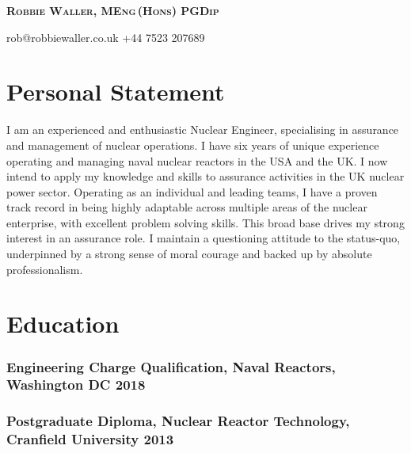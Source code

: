 \documentclass[a4paper, oneside, final, 11pt]{scrartcl} %
\begin{document}


{\fontsize{21}{21}\bfseries\scshape{Robbie Waller, MEng\,(Hons) PGDip}} %

\smallskip

  \faEnvelopeO \space rob@robbiewaller.co.uk \hfill  \faMobile \space +44 7523 207689


\section{Personal Statement}

I am an experienced and enthusiastic Nuclear Engineer, specialising in assurance and management of nuclear operations. I have six years of unique experience operating and managing naval nuclear reactors in the USA and the UK. I now intend to apply my knowledge and skills to assurance activities in the UK nuclear power sector. Operating as an individual and leading teams, I have a proven track record in being highly adaptable across multiple areas of the nuclear enterprise, with excellent problem solving skills. This broad base drives my strong interest in an assurance role. I maintain a questioning attitude to the status-quo, underpinned by a strong sense of moral courage and backed up by absolute professionalism. 

\section{Education}

\subsubsection*{Engineering Charge Qualification,\textnormal{ Naval Reactors, Washington DC} \hfill 2018} 
\smallskip
\subsubsection*{Postgraduate Diploma, \textnormal{Nuclear Reactor Technology, Cranfield University} \hfill 2013}  
\smallskip
\end{document}
